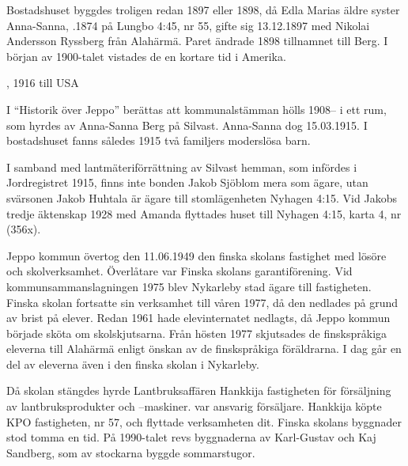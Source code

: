 Bostadshuset byggdes troligen redan 1897 eller 1898, då Edla Marias äldre syster Anna-Sanna, .1874 på Lungbo 4:45, nr 55,	gifte sig 13.12.1897 med Nikolai Andersson Ryssberg från Alahärmä.	Paret ändrade 1898 tillnamnet till Berg. I början av 1900-talet vistades de en kortare tid i Amerika.
\begin{jhchildren}
  \item {}, 1916 till USA
  \item {}
  \item {}
  \item {}
\end{jhchildren}
I ``Historik över Jeppo'' berättas att kommunalstämman hölls 1908-- i ett rum, som hyrdes av Anna-Sanna Berg på Silvast. Anna-Sanna dog 15.03.1915. I bostadshuset fanns således 1915 två familjers moderslösa barn.

I samband med lantmäteriförrättning av Silvast hemman, som infördes i Jordregistret 1915, finns inte bonden Jakob Sjöblom mera som ägare, utan svärsonen Jakob Huhtala är ägare till stomlägenheten Nyhagen 4:15. Vid Jakobs tredje äktenskap 1928 med Amanda flyttades huset till Nyhagen 4:15, karta 4, nr (356x).




Jeppo kommun övertog den 11.06.1949 den finska skolans fastighet med lösöre och skolverksamhet. Överlåtare var Finska  skolans garantiförening. Vid kommunsammanslagningen 1975 blev Nykarleby stad ägare till fastigheten. Finska skolan fortsatte sin verksamhet till våren 1977, då den nedlades på grund av brist på elever. Redan 1961 hade elevinternatet nedlagts, då Jeppo kommun började sköta om skolskjutsarna. Från hösten 1977 skjutsades de finskspråkiga eleverna till Alahärmä enligt önskan av de finskspråkiga föräldrarna. I dag går en del av eleverna även i den finska skolan i Nykarleby.

Då skolan stängdes hyrde Lantbruksaffären Hankkija fastigheten för försäljning av lantbruksprodukter och –maskiner.  var ansvarig försäljare. Hankkija köpte KPO fastigheten, nr 57, och flyttade verksamheten dit. Finska skolans byggnader stod tomma en tid. På 1990-talet revs byggnaderna av Karl-Gustav och Kaj Sandberg, som av stockarna byggde sommarstugor.


